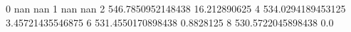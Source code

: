 0 nan nan
1 nan nan
2 546.7850952148438 16.212890625
4 534.0294189453125 3.45721435546875
6 531.4550170898438 0.8828125
8 530.5722045898438 0.0
